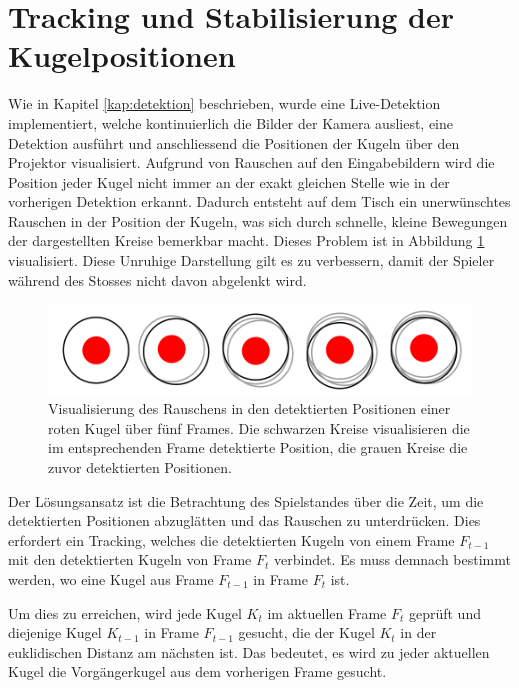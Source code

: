 \section{Tracking und Stabilisierung der Kugelpositionen}\label{kap:tracking}
Wie in Kapitel \ref{kap:detektion} beschrieben, wurde eine Live-Detektion implementiert, welche kontinuierlich
die Bilder der Kamera ausliest, eine Detektion ausführt und anschliessend die Positionen der Kugeln über den Projektor
visualisiert.
Aufgrund von Rauschen auf den Eingabebildern wird die Position jeder Kugel nicht immer an der exakt gleichen Stelle wie
in der vorherigen Detektion erkannt. Dadurch entsteht auf dem Tisch ein unerwünschtes Rauschen in der Position der Kugeln,
was sich durch schnelle, kleine Bewegungen der dargestellten Kreise bemerkbar macht.
Dieses Problem ist in Abbildung \ref{fig:tracking_detected_positions_over_time} visualisiert.
Diese Unruhige Darstellung gilt es zu verbessern, damit der Spieler während des Stosses nicht davon abgelenkt wird.

\begin{figure}[h!]
    \begin{center}
        \includegraphics[width=0.6\linewidth]{../common/03_billiard_ai/resources/tracking_detected_positions_over_time.png}
    \end{center}
    \caption{Visualisierung des Rauschens in den detektierten Positionen einer roten Kugel über fünf Frames. Die schwarzen Kreise visualisieren die im entsprechenden Frame detektierte Position, die grauen Kreise die zuvor detektierten Positionen.}
    \label{fig:tracking_detected_positions_over_time}
\end{figure}

Der Lösungsansatz ist die Betrachtung des Spielstandes über die Zeit, um die detektierten Positionen abzuglätten und
das Rauschen zu unterdrücken.
Dies erfordert ein Tracking, welches die detektierten Kugeln von einem Frame $F_{t-1}$ mit den detektierten Kugeln
von Frame $F_{t}$ verbindet. Es muss demnach bestimmt werden, wo eine Kugel aus Frame $F_{t-1}$ in Frame $F_{t}$ ist.

Um dies zu erreichen, wird jede Kugel $K_{t}$ im aktuellen Frame $F_{t}$ geprüft und diejenige Kugel $K_{t-1}$
in Frame $F_{t-1}$ gesucht, die der Kugel $K_{t}$ in der euklidischen Distanz am nächsten ist.
Das bedeutet, es wird zu jeder aktuellen Kugel die Vorgängerkugel aus dem vorherigen Frame gesucht.

